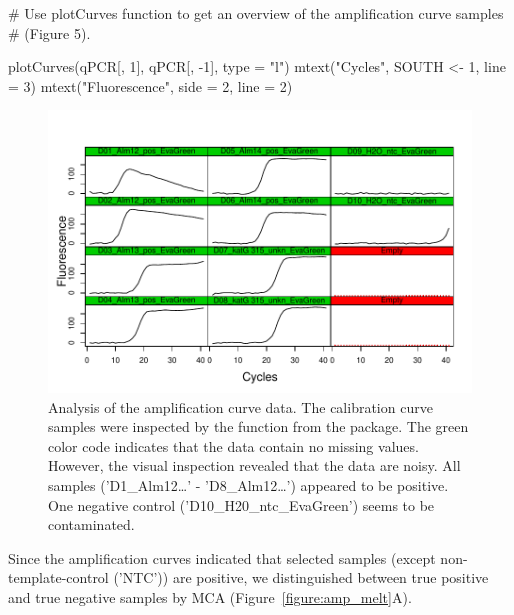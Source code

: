 \begin{example}
# Use plotCurves function to get an overview of the amplification curve samples
# (Figure 5).

plotCurves(qPCR[, 1], qPCR[, -1], type = "l")
mtext("Cycles", SOUTH <- 1, line = 3)
mtext("Fluorescence", side = 2, line = 2)
\end{example}

\begin{figure}[htbp]
  \centering
  \includegraphics[clip=true, trim=0.2cm 0.3cm 0.4cm 1.2cm, width=12cm]{figures/plotCurves.pdf}
  \caption{Analysis of the amplification curve data. The calibration curve 
samples were inspected by the  function from the 
 package. The green color code indicates that the data contain 
no missing values. However, the visual inspection revealed that the data are 
noisy. All samples ('D1\_Alm12\ldots' - 'D8\_Alm12\ldots') appeared to be 
positive. One negative control ('D10\_H20\_ntc\_EvaGreen') 
seems to be contaminated.}
  \label{figure:plotCurves}
\end{figure}

Since the amplification curves indicated that selected samples (except 
non-template-control ('NTC')) are positive, we distinguished between true 
positive and true negative samples by MCA (Figure~\ref{figure:amp_melt}A).

